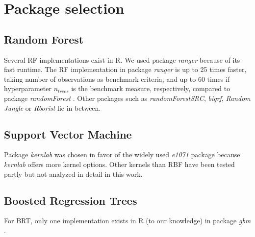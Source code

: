 \documentclass[review]{elsarticle}
\begin{document}
\appendix
\gdef\thesection{\Alph{section}} %
\makeatletter
\renewcommand\@seccntformat[1]{Appendix \csname the#1\endcsname.\hspace{0.5em}}
\makeatother

\section{Package selection}
\label{app: A}

\subsection{Random Forest}

Several \ac{RF} implementations exist in R.
We used package \textit{ranger} because of its fast runtime.
The \ac{RF} implementation in package \textit{ranger} is up to 25 times faster, taking number of observations as benchmark criteria, and up to 60 times if hyperparameter \texttt{$n_{trees}$} is the benchmark measure, respectively, compared to package \textit{randomForest} \citep{ranger}.
Other packages such as \textit{randomForestSRC}, \textit{bigrf}, \textit{Random Jungle} or \textit{Rborist} lie in between.

\subsection{Support Vector Machine}
Package \textit{kernlab} \citep{kernlab} was chosen in favor of the widely used \textit{e1071} \citep{e1071} package because \textit{kernlab} offers more kernel options.
Other kernels than RBF have been tested partly but not analyzed in detail in this work.

\subsection{Boosted Regression Trees}
For \ac{BRT}, only one implementation exists in R (to our knowledge) in package \textit{gbm} \citep{gbm}.
\end{document}

